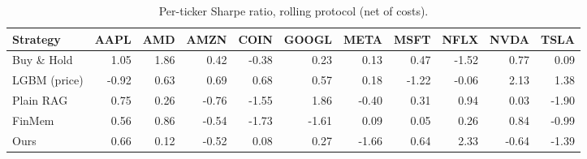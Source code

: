 \begin{table}[ht]
\centering
\caption{Per-ticker Sharpe ratio, rolling protocol (net of costs).}
\label{tab:perticker}
\small
\setlength{\tabcolsep}{4pt}
\begin{tabular}{lrrrrrrrrrr}
\hline
Strategy & AAPL & AMD & AMZN & COIN & GOOGL & META & MSFT & NFLX & NVDA & TSLA \\
\hline
Buy \& Hold & 1.05 & 1.86 & 0.42 & -0.38 & 0.23 & 0.13 & 0.47 & -1.52 & 0.77 & 0.09 \\
LGBM (price) & -0.92 & 0.63 & 0.69 & 0.68 & 0.57 & 0.18 & -1.22 & -0.06 & 2.13 & 1.38 \\
Plain RAG & 0.75 & 0.26 & -0.76 & -1.55 & 1.86 & -0.40 & 0.31 & 0.94 & 0.03 & -1.90 \\
FinMem & 0.56 & 0.86 & -0.54 & -1.73 & -1.61 & 0.09 & 0.05 & 0.26 & 0.84 & -0.99 \\
Ours & 0.66 & 0.12 & -0.52 & 0.08 & 0.27 & -1.66 & 0.64 & 2.33 & -0.64 & -1.39 \\
\hline
\end{tabular}
\end{table}
